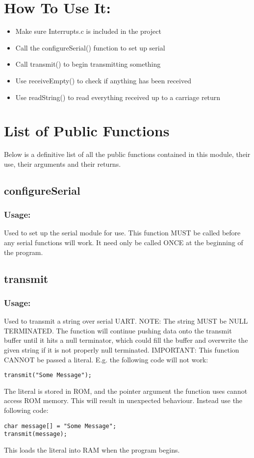 \documentclass[]{report}
\begin{document}
\section{How To Use It:}
\begin{itemize}
	\item Make sure Interrupts.c is included in the project
	\item Call the configureSerial() function to set up serial
	\item Call transmit() to begin transmitting something
	\item Use receiveEmpty() to check if anything has been received
	\item Use readString() to read everything received up to a carriage return
\end{itemize}

\section{List of Public Functions}
Below is a definitive list of all the public functions contained in this module, their use, their arguments and their returns.

\subsection{configureSerial}
\subsubsection{Usage:}
Used to set up the serial module for use. This function MUST be called before any serial functions will work. It need only be called ONCE at the beginning of the program.

\subsection{transmit}
\subsubsection{Usage:}
Used to transmit a string over serial UART. NOTE: The string MUST be NULL TERMINATED. The function will continue pushing data onto the transmit buffer until it hits a null terminator, which could fill the buffer and overwrite the given string if it is not properly null terminated. \newline
IMPORTANT: This function CANNOT be passed a literal. E.g. the following code will not work:
\begin{lstlisting}
transmit("Some Message");
\end{lstlisting} 
The literal is stored in ROM, and the pointer argument the function uses cannot access ROM memory. This will result in unexpected behaviour. Instead use the following code:
\begin{lstlisting}
char message[] = "Some Message";
transmit(message);
\end{lstlisting}
This loads the literal into RAM when the program begins.
\end{document}
